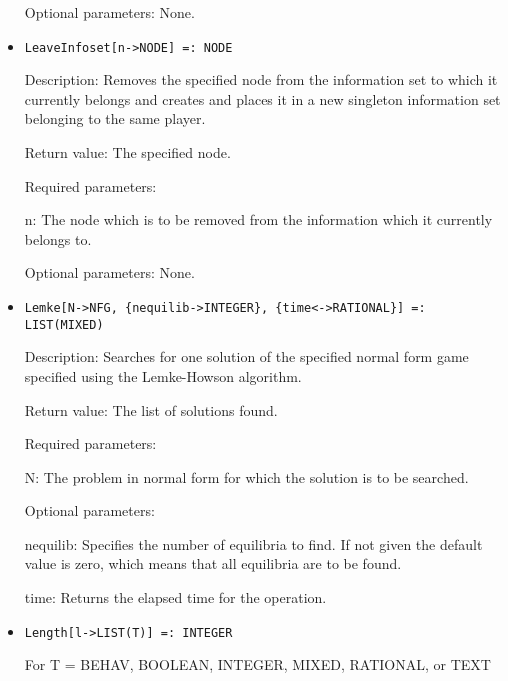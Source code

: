\begin{itemize}
\item
[Optional parameters:] None.
\ed

\item
\protect \large \begin{verbatim}
LeaveInfoset[n->NODE] =: NODE
\end{verbatim}\normalsize

\bd
\item
[Description:] Removes the specified node from the information set to
which it currently belongs and creates and places it in a new
singleton information set belonging to the same player.
\item
[Return value:] The specified node.
\item
[Required parameters:]\hfil\null
	  
\bd
\item
[n:] The node which is to be removed from the information which it
currently belongs to.
\ed

\item
[Optional parameters:] None.
\ed

\item
\protect \large \begin{verbatim}
Lemke[N->NFG, {nequilib->INTEGER}, {time<->RATIONAL}] =: LIST(MIXED)
\end{verbatim}\normalsize

\bd
\item
[Description:] Searches for one solution of the specified normal form
game specified using the Lemke-Howson algorithm.
\item
[Return value:] The list of solutions found.
\item
[Required parameters:]\hfil\null

\bd
\item
[N:] The problem in normal form for which the solution is to be
searched.
\ed

\item
[Optional parameters:]\hfil\null

\bd
\item
[nequilib:] Specifies the number of equilibria to find.  If not given
the default value is zero, which means that all equilibria are to be
found.
\item
[time:] Returns the elapsed time for the operation.
\ed
\ed

\item
\protect \large \begin{verbatim}
Length[l->LIST(T)] =: INTEGER
\end{verbatim}\normalsize
	For T = BEHAV, BOOLEAN, INTEGER, MIXED, RATIONAL, or TEXT


\end{itemize}
